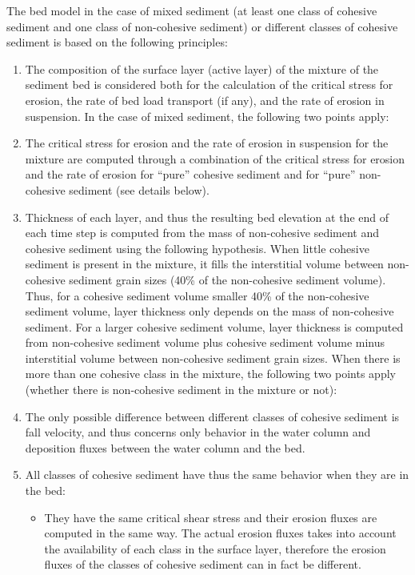 The bed model in the case of mixed sediment (at least one class of cohesive sediment and one class of non-cohesive sediment) or different classes of cohesive sediment is based on the following principles:
\begin{enumerate}
\item The composition of the surface layer (active layer) of the mixture of the sediment bed is considered both for the calculation of the critical stress for erosion, the rate of bed load transport (if any), and the rate of erosion in suspension.
In the case of mixed sediment, the following two points apply:
\item The critical stress for erosion and the rate of erosion in suspension for the mixture are computed through a combination of the critical stress for erosion and the rate of erosion for ``pure'' cohesive sediment and for ``pure'' non-cohesive sediment (see details below). 
\item Thickness of each layer, and thus the resulting bed elevation at the end of each time step is computed from the mass of non-cohesive sediment and cohesive sediment using the following hypothesis. When little cohesive sediment is present in the mixture, it fills the interstitial volume between non-cohesive sediment grain sizes (40\% of the non-cohesive sediment volume). Thus, for a cohesive sediment volume smaller 40\% of the non-cohesive sediment volume, layer thickness only depends on the mass of non-cohesive sediment. For a larger cohesive sediment volume, layer thickness is computed from non-cohesive sediment volume plus cohesive sediment volume minus interstitial volume between non-cohesive sediment grain sizes.
When there is more than one cohesive class in the mixture, the following two points apply (whether there is non-cohesive sediment in the mixture or not):
\item The only possible difference between different classes of cohesive sediment is fall velocity, and thus concerns only behavior in the water column and deposition fluxes between the water column and the bed.
\item All classes of cohesive sediment have thus the same behavior when they are in the bed:
  \begin{itemize}
    \item They have the same critical shear stress and their erosion fluxes are computed in the same way. The actual erosion fluxes takes into account the availability of each class in the surface layer, therefore the erosion fluxes of the classes of cohesive sediment can in fact be different.

\end{itemize}
\end{enumerate}
